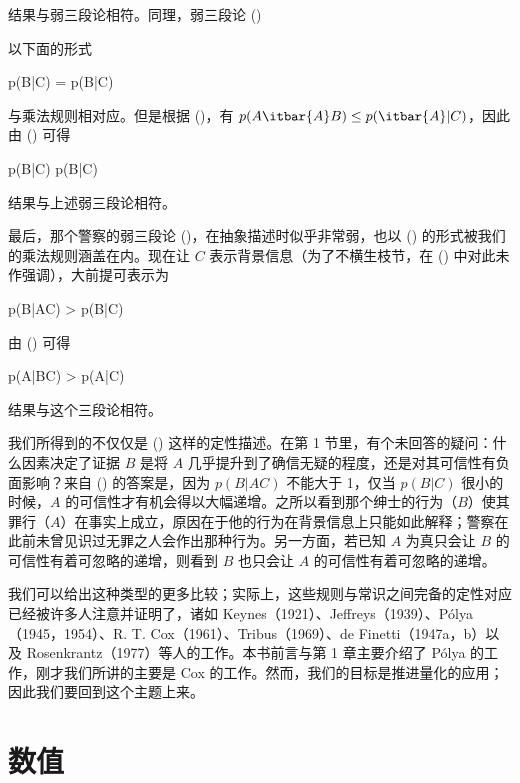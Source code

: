 结果与弱三段论相符。同理，弱三段论 (\in[weak-2])

\placeformula[2-75]
\startformula
{}
\stopformula

以下面的形式

\placeformula[2-76]
\startformula
p(B|C) = p(B|C)
\stopformula

与乘法规则相对应。但是根据 (\in[2-74])，有 $p(A\itbar{A}B)\le p(\itbar{A}|C)$，因此由 (\in[2-76]) 可得

\placeformula[2-77]
\startformula
p(B|C) \le p(B|C)
\stopformula

结果与上述弱三段论相符。

最后，那个警察的弱三段论 (\in[weak-3])，在抽象描述时似乎非常弱，也以 (\in[2-73]) 的形式被我们的乘法规则涵盖在内。现在让 $C$ 表示背景信息（为了不横生枝节，在 (\in[weak-3]) 中对此未作强调），大前提可表示为

\placeformula[2-78]
\startformula
p(B|AC) > p(B|C)
\stopformula

由 (\in[2-73]) 可得

\placeformula[2-79]
\startformula
p(A|BC) > p(A|C)
\stopformula

结果与这个三段论相符。

我们所得到的不仅仅是 (\in[2-79]) 这样的定性描述。在第 1 节里，有个未回答的疑问：什么因素决定了证据 $B$ 是将 $A$ 几乎提升到了确信无疑的程度，还是对其可信性有负面影响？来自 (\in[2-73]) 的答案是，因为 $p(B|AC)$ 不能大于 1，仅当 $p(B|C)$ 很小的时候，$A$ 的可信性才有机会得以大幅递增。之所以看到那个绅士的行为（$B$）使其罪行（$A$）在事实上成立，原因在于他的行为在背景信息上只能如此解释；警察在此前未曾见识过无罪之人会作出那种行为。另一方面，若已知 $A$ 为真只会让 $B$ 的可信性有着可忽略的递增，则看到 $B$ 也只会让 $A$ 的可信性有着可忽略的递增。

我们可以给出这种类型的更多比较；实际上，这些规则与常识之间完备的定性对应已经被许多人注意并证明了，诸如 Keynes（1921）、Jeffreys（1939）、P\'olya（1945，1954）、R. T. Cox（1961）、Tribus（1969）、de Finetti（1947a，b）以及 Rosenkrantz（1977）等人的工作。本书前言与第 1 章主要介绍了 P\'olya 的工作，刚才我们所讲的主要是 Cox 的工作。然而，我们的目标是推进量化的应用；因此我们要回到这个主题上来。

\section{数值}

